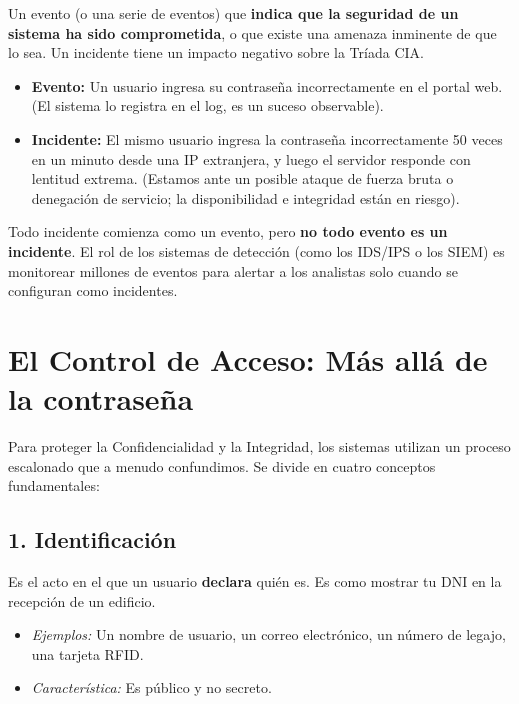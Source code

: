 \documentclass[11pt,a4paper]{article}
\begin{document}
\begin{definicion}
Un evento (o una serie de eventos) que \textbf{indica que la seguridad de un sistema ha sido comprometida}, o que existe una amenaza inminente de que lo sea. Un incidente tiene un impacto negativo sobre la Tríada CIA.
\end{definicion}

\begin{ejemplo}
\begin{itemize}[leftmargin=*]
  \item \textbf{Evento:} Un usuario ingresa su contraseña incorrectamente en el portal web. (El sistema lo registra en el log, es un suceso observable).
  \item \textbf{Incidente:} El mismo usuario ingresa la contraseña incorrectamente 50 veces en un minuto desde una IP extranjera, y luego el servidor responde con lentitud extrema. (Estamos ante un posible ataque de fuerza bruta o denegación de servicio; la disponibilidad e integridad están en riesgo).
\end{itemize}
\end{ejemplo}

\begin{clave}
Todo incidente comienza como un evento, pero \textbf{no todo evento es un incidente}. El rol de los sistemas de detección (como los IDS/IPS o los SIEM) es monitorear millones de eventos para alertar a los analistas solo cuando se configuran como incidentes.
\end{clave}

\section{El Control de Acceso: Más allá de la contraseña}
Para proteger la Confidencialidad y la Integridad, los sistemas utilizan un proceso escalonado que a menudo confundimos. Se divide en cuatro conceptos fundamentales:

\subsection{1. Identificación}
Es el acto en el que un usuario \textbf{declara} quién es. Es como mostrar tu DNI en la recepción de un edificio.
\begin{itemize}[leftmargin=*]
  \item \textit{Ejemplos:} Un nombre de usuario, un correo electrónico, un número de legajo, una tarjeta RFID.
  \item \textit{Característica:} Es público y no secreto.
\end{itemize}
\end{document}
